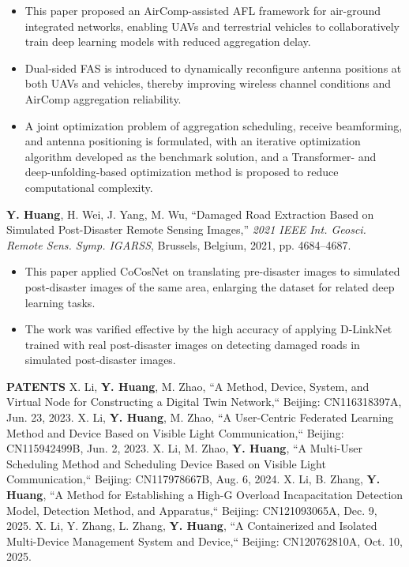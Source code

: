 \documentclass{resume}
\begin{document}
\begin{itemize}
  \item This paper proposed an AirComp-assisted AFL framework for air-ground integrated networks, enabling UAVs and terrestrial vehicles to collaboratively train deep learning models with reduced aggregation delay.

  \item Dual-sided FAS is introduced to dynamically reconfigure antenna positions at both UAVs and vehicles, thereby improving wireless channel conditions and AirComp aggregation reliability.

  \item A joint optimization problem of aggregation scheduling, receive beamforming, and antenna positioning is formulated, with an iterative optimization algorithm developed as the benchmark solution, and a Transformer- and deep-unfolding-based optimization method is proposed to reduce computational complexity.
\end{itemize}
\textbf{Y. Huang}, H. Wei, J. Yang, M. Wu, ``Damaged Road Extraction Based on Simulated Post-Disaster Remote Sensing Images,'' \textit{2021 IEEE Int. Geosci. Remote Sens. Symp. IGARSS}, Brussels, Belgium, 2021, pp. 4684--4687.
\begin{itemize}
  \item This paper applied CoCosNet on translating pre-disaster images to simulated post-disaster images of the same area, enlarging the dataset for related deep learning tasks. 
  \item The work was varified effective by the high accuracy of applying D-LinkNet trained with real post-disaster images on detecting damaged roads in simulated post-disaster images. 
\end{itemize}

\textbf{PATENTS} \newline
X. Li, \textbf{Y. Huang}, M. Zhao, ``A Method, Device, System, and Virtual Node for Constructing a Digital Twin Network,`` Beijing: CN116318397A, Jun. 23, 2023. \newline
X. Li, \textbf{Y. Huang}, M. Zhao, ``A User-Centric Federated Learning Method and Device Based on Visible Light Communication,`` Beijing: CN115942499B, Jun. 2, 2023. \newline
X. Li, M. Zhao, \textbf{Y. Huang}, ``A Multi-User Scheduling Method and Scheduling Device Based on Visible Light Communication,`` Beijing: CN117978667B, Aug. 6, 2024. \newline
X. Li, B. Zhang, \textbf{Y. Huang}, ``A Method for Establishing a High-G Overload Incapacitation Detection Model, Detection Method, and Apparatus,`` Beijing: CN121093065A, Dec. 9, 2025. \newline
X. Li, Y. Zhang, L. Zhang, \textbf{Y. Huang}, ``A Containerized and Isolated Multi-Device Management System and Device,`` Beijing: 	CN120762810A, Oct. 10, 2025.
\end{document}
